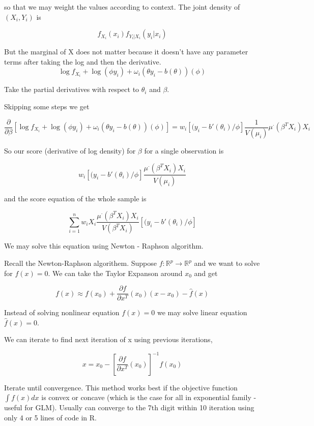 \documentclass[11pt,fleqn]{book} %
\begin{document}
 	so that we may weight the values according to context. The joint density of $(X_i, Y_i)$ is

 		$$f_{X_i}(x_i) f_{Y_i| X_i}(y_i|x_i) $$

 	But the marginal of X does not matter because it doesn't have any parameter terms after taking the log and then the derivative.\\

 			$$\log f_{X_i} + \log (\phi y_i) + \omega_i(\theta y_i - b(\theta)) (\phi) $$


 	Take the partial derivatives with respect to $\theta_i$ and $\beta$. 

 	Skipping some steps we get 

 			$$\frac{\partial}{\partial \beta}[\log f_{X_i} + \log (\phi y_i) + \omega_i(\theta y_i - b(\theta)) (\phi) ] = w_i [(y_i - b'(\theta_i) / \phi] \frac{1}{V(\mu_i)} \mu^\cdot(\beta^T X_i) X_i $$

 	So our score (derivative of log density) for $\beta$ for a single observation is

 			$$w_i [(y_i - b'(\theta_i) / \phi] \frac{\mu^\cdot(\beta^T X_i) X_i}{V(\mu_i)}  $$

 	and the score equation of the whole sample is 

 			$$\sum^n_{i=1}  w_i  X_i \frac{\mu^\cdot(\beta^T X_i) X_i}{V(\beta^T X_i)} [(y_i - b'(\theta_i) / \phi] $$

 	We may solve this equation using Newton - Raphson algorithm. 




 	\begin{remark}
 		Recall the Newton-Raphson algorithem. Suppose $f: \mathbb{R}^p \rightarrow \mathbb{R}^p$ and we want to solve for $f(x) = 0$.  We can take the Taylor Expanson around $x_0$ and get

 				$$f(x) \approx f(x_0) + \frac{\partial f}{\partial x^T} (x_0) (x - x_0) - \hat{f}(x) $$

 		Instead of solving nonlinear equation $f(x) = 0$ we may solve linear equation $\hat{f}(x) = 0$. 

 		We can iterate to find next iteration of x using previous iterations,

 				$$x = x_0 - [\frac{\partial f}{\partial x^T}(x_0)]^{-1} f(x_0) $$

 		Iterate until convergence. This method works best if the objective function $\int f(x) dx$ is convex or concave (which is the case for all in exponential family - useful for GLM). Usually can converge to the 7th digit within 10 iteration using only 4 or 5 lines of code in R.
 	\end{remark}
\end{document}
